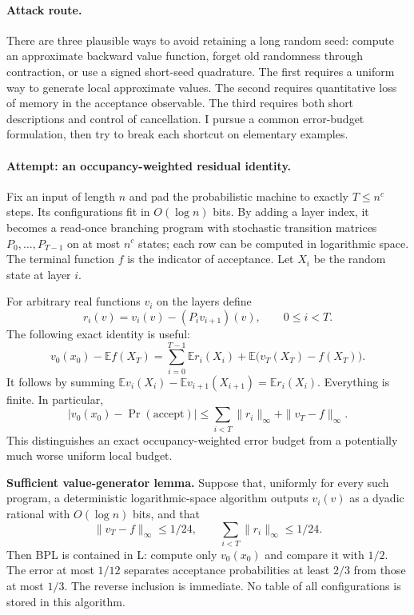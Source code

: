\documentclass[11pt,a4paper]{article}
\newcommand{\E}{\mathbb{E}}
\numberwithin{equation}{section}
\begin{document}
\paragraph{Attack route.}
There are three plausible ways to avoid retaining a long random seed:
compute an approximate backward value function, forget old randomness
through contraction, or use a signed short-seed quadrature. The first
requires a uniform way to generate local approximate values. The second
requires quantitative loss of memory in the acceptance observable. The
third requires both short descriptions and control of cancellation.
I pursue a common error-budget formulation, then try to break each
shortcut on elementary examples.

\paragraph{Attempt: an occupancy-weighted residual identity.}
Fix an input of length $n$ and pad the probabilistic machine to exactly
$T\le n^c$ steps. Its configurations fit in $O(\log n)$ bits. By adding
a layer index, it becomes a read-once branching program with stochastic
transition matrices $P_0,\ldots,P_{T-1}$ on at most $n^c$ states; each
row can be computed in logarithmic space. The terminal function $f$ is
the indicator of acceptance. Let $X_i$ be the random state at layer $i$.

For arbitrary real functions $v_i$ on the layers define
\[
 r_i(v)=v_i(v)-(P_iv_{i+1})(v),\qquad 0\le i<T.
\]
The following exact identity is useful:
\begin{equation}\label{30004922:residual}
 v_0(x_0)-\E f(X_T)
 =\sum_{i=0}^{T-1}\E r_i(X_i)
       +\E\bigl(v_T(X_T)-f(X_T)\bigr).
\end{equation}
It follows by summing
$\E v_i(X_i)-\E v_{i+1}(X_{i+1})=\E r_i(X_i)$.
Everything is finite. In particular,
\begin{equation}\label{30004922:residual-bound}
 |v_0(x_0)-\Pr(\mathrm{accept})|
 \le\sum_{i<T}\|r_i\|_\infty+\|v_T-f\|_\infty.
\end{equation}
This distinguishes an exact occupancy-weighted error budget from a
potentially much worse uniform local budget.

\textbf{Sufficient value-generator lemma.} Suppose that, uniformly for
every such program, a deterministic logarithmic-space algorithm outputs
$v_i(v)$ as a dyadic rational with $O(\log n)$ bits, and that
\[
 \|v_T-f\|_\infty\le1/24,
 \qquad\sum_{i<T}\|r_i\|_\infty\le1/24.
\]
Then BPL is contained in L: compute only $v_0(x_0)$ and compare it with
$1/2$. The error at most $1/12$ separates acceptance probabilities at
least $2/3$ from those at most $1/3$. The reverse inclusion is immediate.
No table of all configurations is stored in this algorithm.
\end{document}
